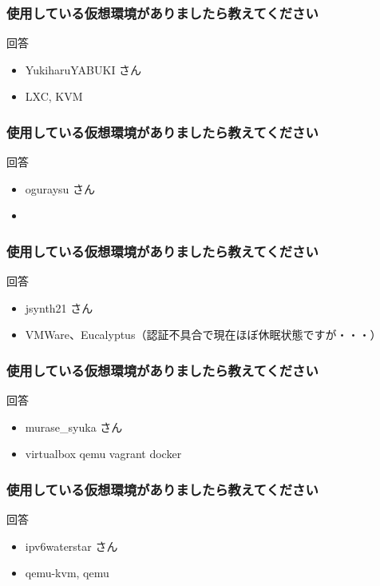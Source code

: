 \documentclass[cjk,dvipdfmx,12pt,compress,%
hyperref={bookmarks=true,bookmarksnumbered=true,bookmarksopen=false,%
colorlinks=false,%
pdftitle={第 120 回 関西 Debian 勉強会},%
pdfauthor={倉敷・のがた・佐々木・かわだ・おおつき},%
pdfsubject={資料},%
}]{beamer}
\begin{document}
\begin{frame}[fragile]
  \frametitle{使用している仮想環境がありましたら教えてください}
  \begin{block}{回答}
	\begin{itemize}
	\item YukiharuYABUKI さん
	\item LXC, KVM
	\end{itemize}
  \end{block}
\end{frame}

\begin{frame}[fragile]
  \frametitle{使用している仮想環境がありましたら教えてください}
  \begin{block}{回答}
	\begin{itemize}
	\item oguraysu さん
	\item 
	\end{itemize}
  \end{block}
\end{frame}

\begin{frame}[fragile]
  \frametitle{使用している仮想環境がありましたら教えてください}
  \begin{block}{回答}
	\begin{itemize}
	\item jsynth21 さん
	\item VMWare、Eucalyptus（認証不具合で現在ほぼ休眠状態ですが・・・）
	\end{itemize}
  \end{block}
\end{frame}

\begin{frame}[fragile]
  \frametitle{使用している仮想環境がありましたら教えてください}
  \begin{block}{回答}
	\begin{itemize}
	\item murase\_syuka さん
	\item virtualbox qemu vagrant docker
	\end{itemize}
  \end{block}
\end{frame}

\begin{frame}[fragile]
  \frametitle{使用している仮想環境がありましたら教えてください}
  \begin{block}{回答}
	\begin{itemize}
	\item ipv6waterstar さん
	\item qemu-kvm, qemu
	\end{itemize}
  \end{block}
\end{frame}
\end{document}
